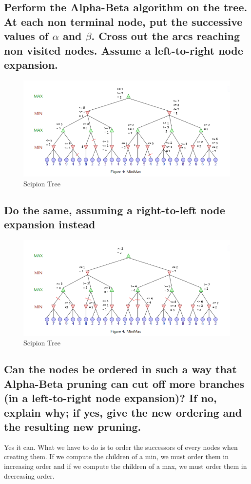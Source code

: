 \documentclass[a4paper,10pt]{article}
\begin{document}
		\subsection{Perform the Alpha-Beta algorithm on the tree. At each non terminal node, put the successive values of $\alpha$ and $\beta$. Cross out the arcs reaching non visited nodes. Assume a left-to-right node expansion.}
		\begin{figure}[h!]
			\centering
				\includegraphics[scale=0.8]{tree-fig5.png}
			\caption{Scipion Tree}
		\end{figure}
		\subsection{Do the same, assuming a right-to-left node expansion instead}
		\begin{figure}[h!]
			\centering
				\includegraphics[scale=0.8]{tree-fig6.png}
			\caption{Scipion Tree}
			\label{fig:server_connection}	
		\end{figure}
		\subsection{Can the nodes be ordered in such a way that Alpha-Beta pruning can cut off more branches (in a left-to-right node expansion)? If no, explain why; if yes,
give the new ordering and the resulting new pruning.}
		Yes it can. What we have to do is to order the successors of every nodes when creating them. If we compute the children of a min, we must order them in increasing order and if we compute the children of a max, we must order them in decreasing order.
\end{document}
